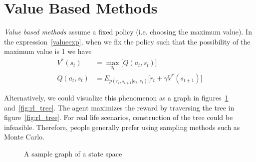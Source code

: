\documentclass{book}
\numberwithin{equation}{subsection}
\begin{document}
\section{Value Based Methods}
\textit{Value based methods} assume a fixed policy (i.e. choosing the maximum value). In the expression~\ref{valueexp}, when we fix the policy such that the possibility of the maximum value is 1 we have 
\begin{align}
    V^*(s_t) &= \max_{a_t}\big[Q(a_t, s_t)\big]\\
    Q(a_t, s_t) &= E_{p(r_t,s_{t+1}|a_t,s_t)}\big[r_t+\gamma V^*(s_{t+1})\big]
\end{align}

Alternatively, we could visualize this phenomenon as a graph in figures~\ref{fig:rl_graph} and~\ref{fig:rl_tree}. The agent maximizes the reward by traversing the tree in figure~\ref{fig:rl_tree}. For real life scenarios, construction of the tree could be infeasible. Therefore, people generally prefer using sampling methods such as Monte Carlo.

\begin{figure}[H]
\centering
{}
\caption{A sample graph of a state space}
\label{fig:rl_graph}
\end{figure}
\end{document}

